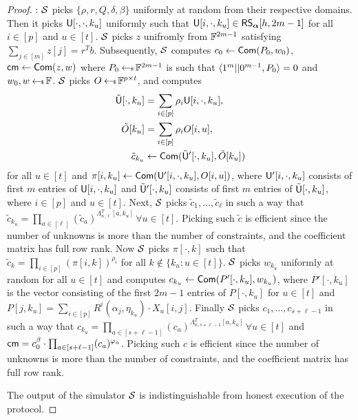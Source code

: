 \begin{proof}
: 
 $\mathcal{S}$ picks $\{\rho, r, Q, \delta, \beta \}$ uniformly at random from their
respective domains. Then it picks $\mathsf{U}[\cdot, \cdot, k_u]$ uniformly such that
$\mathsf{U}[i,\cdot,k_u]\in \mathsf{RS}_{\bm{\alpha}}[h,2m-1]$ for all $i\in [p]$ and $u\in [t]$.
$\mathcal{S}$ picks $z$
unifromly from $\mathbb{F}^{2m-1}$ satisfying $\sum_{j\in[m]} z[j] = r^Tb$.
Subsequently,
$\mathcal{S}$ computes $c_0 \leftarrow \mathsf{Com}(P_0,w_0)$, $\mathsf{cm} \leftarrow \mathsf{Com}(z,w)$
where $P_0\hskip2.3pt{\gets\!\!\mbox{\tiny${\$}$\normalsize}}\, \mathbb{F}^{2m-1}$ is such that $\langle 1^m||0^{m-1},P_0\rangle=0$ and $w_0,w\hskip2.3pt{\gets\!\!\mbox{\tiny${\$}$\normalsize}}\,
\mathbb{F}$. $\mathcal{S}$ picks $O\hskip2.3pt{\gets\!\!\mbox{\tiny${\$}$\normalsize}}\, \mathbb{F}^{p\times t}$, and computes
\begin{align*}
	\tilde{\mathsf{U}}[\cdot,k_u] &= \sum_{i\in[p]} \rho_i \mathsf{U}[i,\cdot, k_u],\\
	\tilde{O}[k_u] &= \sum_{i\in[p]} \rho_i O[i,u],\\
	\tilde{c}_{k_u} &\leftarrow \mathsf{Com}(\tilde{\mathsf{U}}'[\cdot, k_u],\tilde{O}[k_u] )
\end{align*}
 for all $u\in[t]$ and $\pi[i,k_u] \leftarrow \mathsf{Com}(\mathsf{U}'[i,\cdot,k_u],
O[i,u])$, where $\mathsf{U}'[i,\cdot,k_u]$ consists of first $m$ entries of
$\mathsf{U}[i,\cdot,k_u]$ and $\tilde{\mathsf{U}}'[\cdot,k_u]$ consists of first $m$ entries of
$\tilde{\mathsf{U}}[\cdot,k_u]$, where $i\in[p]$ and $u\in [t]$. Next, $\mathcal{S}$ picks
$\tilde{c}_1, \ldots, \tilde{c}_{\ell}$ in such a way that $\tilde{c}_{k_u} =
\prod_{a\in[\ell]} (\tilde{c}_a)^{\Lambda^T_{n,\ell}[a,k_u]} \, \forall u\in
[t]$. Picking such $\tilde{c}$ is efficient since the number of unknowns is more
than the number of constraints, and the coefficient matrix has full row rank.
Now $\mathcal{S}$ picks $\pi[\cdot, k]$ such that $\tilde{c}_k = \prod_{i\in[p]}(
\pi[i,k])^{\rho_i}$ for all $k\notin \{k_u:u\in [t]\}$. $\mathcal{S}$ picks $w_{k_u}$
uniformly at random for all $u\in [t]$ and computes $c_{k_u} \leftarrow
\mathsf{Com}(P'[\cdot,k_u], w_{k_u})$, where $P'[\cdot,k_u]$ is the vector consisting
of the first $2m-1$ entries
of $P[\cdot,k_u]$ for $ u\in[t]$ and $P[j,k_u] = \sum_{i\in[p]}R^i(\alpha_j,\eta_{k_u})\cdot X_u[i,j]$. Finally $\mathcal{S}$ picks ${c}_1, \ldots, {c}_{s+\ell-1}$
in such a way that ${c}_{k_u} = \prod_{a\in[s+\ell-1]}
({c}_a)^{\Lambda^T_{n,s+\ell-1}[a,k_u]} \, \forall u\in [t]$
and $\mathsf{cm} =  c_0^{\beta} \cdot \prod_{a\in[s+\ell-1]} (c_a)^{\varphi_a}$. Picking such ${c}$ is efficient since the number of unknowns is more than the number of constraints, and the coefficient matrix has full row rank.

The output of the simulator $\mathcal{S}$ is indistinguishable from honest execution of the protocol.
\end{proof}
